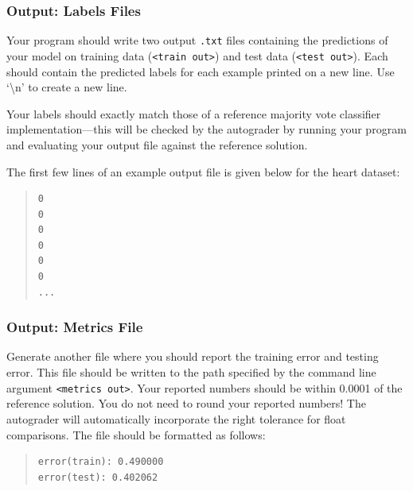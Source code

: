 \documentclass[11pt,addpoints,answers]{exam}
\begin{document}


\subsubsection{Output: Labels Files}
\label{sec:labels}

Your program should write two output \lstinline{.txt} files containing the predictions of your model on training data (\lstinline{<train out>}) and test data (\lstinline{<test out>}). Each should contain the predicted labels for each example printed on a new line. Use `\textbackslash n' to create a new line.

Your labels should exactly match those of a reference majority vote classifier implementation---this will be checked by the autograder by running your program and evaluating your output file against the reference solution.

%
The first few lines of an example output file is given below for the heart dataset:
\begin{quote}
\begin{verbatim}
0
0
0
0
0
0
...
\end{verbatim}
\end{quote}

\subsubsection{Output: Metrics File}
\label{sec:metrics}

Generate another file where you should report the training error and testing error. This file should be written to the path specified by the command line argument \lstinline{<metrics out>}. Your reported numbers should be within 0.0001 of the reference solution. You do not need to round your reported numbers! The autograder will automatically incorporate the right tolerance for float comparisons. The file should be formatted as follows:

\begin{quote}
\begin{verbatim}
error(train): 0.490000
error(test): 0.402062
\end{verbatim}
\end{quote}
\end{document}
